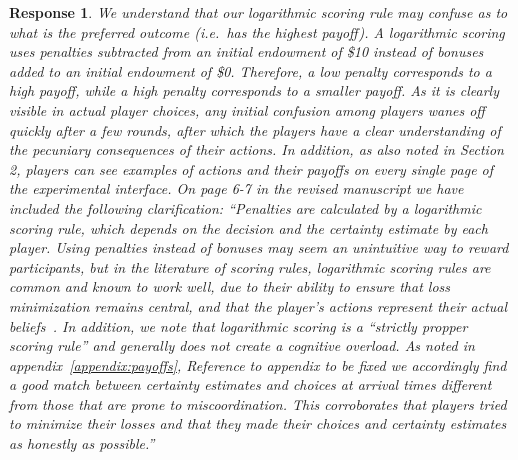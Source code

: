 \documentclass[a4paper]{article}
\newtheorem{response}{Response}
\newenvironment{tobo}{\smallskip \noindent \color{yellow!80!black!80}}{\color{black}\smallskip}
\begin{document}
\begin{enumerate}
  \begin{response}\label{payoff2} 
  We understand that our logarithmic scoring rule may confuse as to what is the preferred outcome (i.e.\ has the highest payoff). A logarithmic scoring uses penalties subtracted from an initial endowment of \$10 instead of bonuses added to an initial endowment of \$0. Therefore, a low penalty corresponds to a high payoff, while a high penalty corresponds to a smaller payoff. As it is clearly visible in actual player choices, any initial confusion among players wanes off quickly after a few rounds, after which the players have a clear understanding of the pecuniary consequences of their actions. In addition, as also noted in Section 2, players can see examples of actions and their payoffs on every single page of the experimental interface. On page 6-7 in the revised manuscript we have included the following clarification: ``Penalties are calculated by a logarithmic scoring rule, which depends on the decision and the certainty estimate by each player. Using penalties instead of bonuses may seem an unintuitive way to reward participants, but in the literature of scoring rules, logarithmic scoring rules are common and known to work well, due to their ability to ensure that loss minimization remains central, and that the player's actions represent their actual beliefs~\cite{good1992rational, seidenfeld1985calibration, palfrey2009eliciting, mccutcheon2019favor}. In addition, we note that logarithmic scoring is a ``strictly propper scoring rule'' and generally does not create a cognitive overload. As noted in appendix~\ref{appendix:payoffs}, \begin{tobo} Reference to appendix to be fixed \end{tobo} we accordingly find a good match between certainty estimates and choices at arrival times different from those that are prone to miscoordination. This corroborates that players tried to minimize their losses and that they made their choices and certainty estimates as honestly as possible.''
\end{response}


\end{enumerate}
\end{document}
